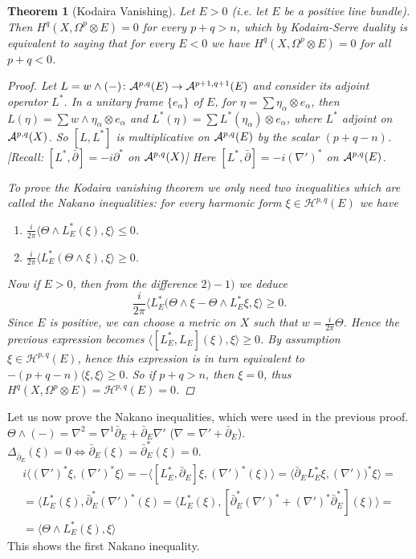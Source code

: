 \documentclass[A4paper, british, reqno]{amsart}
\theoremstyle{darkgreentheorem}
\newtheorem{thm}{Theorem}[section]
\theoremstyle{darkbluedefinition}
\theoremstyle{darkredexample}
\theoremstyle{remark}
\renewcommand{\H}{\mathcal{H}}
\newcommand{\1}{\mathbbm{1}}
\newcommand{\ot}{\otimes}
\begin{document}
\begin{thm}[Kodaira Vanishing]
    Let $E>0$ (i.e. let $E$ be a positive line bundle).
    Then $H^{q}(X,\Omega^{p}\ot E)=0$ for every $p+q>n$, which by Kodaira-Serre duality is equivalent to saying that for every $E<0$ we have $H^{q}(X,\Omega^{p}\ot E)=0$ for all $p+q<0$.
    \begin{proof}
	Let $L=w\wedge (-)\colon \mathcal{A}^{p,q}(E)\to \mathcal{A}^{p+1,q+1}(E)$ and consider its adjoint operator $L^{*}$.
	In a unitary frame $\{e_{\alpha}\}$ of $E$, for $\eta=\sum \eta_{\alpha}\ot e_{\alpha}$, then $L(\eta)=\sum w\wedge \eta_{\alpha}\ot e_{\alpha}$ and $L^{*}(\eta)=\sum L^{*}(\eta_{\alpha})\ot e_{\alpha}$, where $L^{*}$ adjoint on $\mathcal{A}^{p,q}(X)$.
	So $[L,L^{*}]$ is multiplicative on $\mathcal{A}^{p,q}(E)$ by the scalar $(p+q-n)$.
	[Recall: $[L^{*},\bar{\partial}]=-i\partial^{*}$ on $\mathcal{A}^{p,q}(X)$]
	Here $[L^{*},\bar{\partial}]=-i(\nabla')^{*}$ on $\mathcal{A}^{p,q}(E)$.

	To prove the Kodaira vanishing theorem we only need two inequalities which are called the \textit{Nakano inequalities}: for every harmonic form $\xi \in \H^{p,q}(E)$ we have
	\begin{enumerate}[label=\arabic*)]
	    \item $\frac{i}{2\pi} \langle \Theta \wedge L_{E}^{*}(\xi), \xi\rangle \leqslant 0$.
	    \item $\frac{i}{2\pi} \langle L_{E}^{*}(\Theta \wedge \xi),\xi\rangle \geqslant 0$.
	\end{enumerate}

	Now if $E>0$, then from the difference $2)-1)$ we deduce
	\[ \frac{i}{2\pi}\langle L_{E}^{*}(\Theta \wedge \xi -\Theta \wedge L_{E}^{*}\xi ,\xi\rangle \geqslant 0 .\]
	Since $E$ is positive, we can choose a metric on $X$ such that $w=\frac{i}{2\pi}\Theta$.
	Hence the previous expression becomes $\langle [L_{E}^{*},L_{E}](\xi),\xi\rangle \geqslant 0$.
	By assumption $\xi\in \H^{p,q}(E)$, hence this expression is in turn equivalent to $-(p+q-n)\langle \xi ,\xi\rangle \geqslant 0 $.
	So if $p+q>n$, then $\xi=0$, thus $H^{q}(X,\Omega^{p}\ot E)=\H^{p,q}(E)=0$.
    \end{proof}
\end{thm}

Let us now prove the Nakano inequalities, which were used in the previous proof.
$\Theta \wedge (-)=\nabla^{2}=\nabla^{1}\bar{\partial}_{E}+\bar{\partial}_{E}\nabla'$ ($\nabla=\nabla'+\bar{\partial}_{E}$).
$\Delta_{\bar{\partial}_{E}}(\xi)=0 \Leftrightarrow \bar{\partial }_{E}(\xi)=\bar{\partial}_{E}^{*}(\xi)=0$.
\begin{multline*}
    i\langle (\nabla')^{*}\xi,(\nabla')^{*}\xi\rangle=-\langle [L_{E}^{*},\bar{\partial}_{E}]\xi,(\nabla')^{*}(\xi)\rangle = \langle \bar{\partial}_{E} L_{E}^{*}\xi,(\nabla'))^{*}\xi\rangle =\\
    =\langle L_{E}^{*}(\xi),\bar{\partial}_{E}^{*}(\nabla')^{*}(\xi)=\langle L_{E}^{*}(\xi),[\bar{\partial}_{E}^{*}(\nabla')^{*}+(\nabla')^{*}\bar{\partial}_{E}^{*}](\xi)\rangle = \\
    =\langle \Theta \wedge L_{E}^{*}(\xi),\xi\rangle 
\end{multline*}
This shows the first Nakano inequality.
\end{document}
